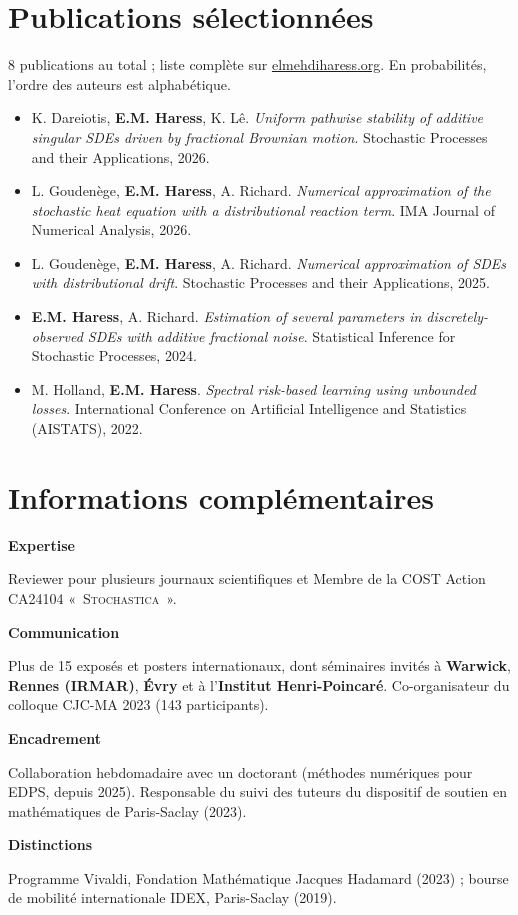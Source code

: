 \documentclass[10pt,a4paper]{article}
\newlength{\datecol}\setlength{\datecol}{0.165\textwidth}
\newlength{\gutter}\setlength{\gutter}{1em}
\newlength{\bodycol}
\newcommand{\skillrow}[2]{%
  \par\noindent
  \begin{minipage}[t]{\datecol}
    \vspace{0pt}\raggedright{\headingfont\bfseries\footnotesize #1}
  \end{minipage}%
  \hspace{\gutter}%
  \begin{minipage}[t]{\bodycol}
    \vspace{0pt}\raggedright\small #2
  \end{minipage}%
  \par\vspace{0.7ex}
}
\begin{document}
\section{Publications sélectionnées}
{\footnotesize\color{muted}8 publications au total ; liste complète sur \href{https://elmehdiharess.org}{elmehdiharess.org}.
En probabilités, l'ordre des auteurs est alphabétique.\par}
\vspace{0.6ex}
\begin{itemize}[leftmargin=1.3em, itemsep=0.35ex, topsep=0pt, label={\textcolor{accent}{\scriptsize$\blacktriangleright$}}]
  \footnotesize
  \item K. Dareiotis, \textbf{E.M. Haress}, K. Lê. \emph{Uniform pathwise stability of additive singular SDEs
  driven by fractional Brownian motion}. Stochastic Processes and their Applications, 2026.
  \item L. Goudenège, \textbf{E.M. Haress}, A. Richard. \emph{Numerical approximation of the stochastic heat
  equation with a distributional reaction term}. IMA Journal of Numerical Analysis, 2026.
  \item L. Goudenège, \textbf{E.M. Haress}, A. Richard. \emph{Numerical approximation of SDEs with
  distributional drift}. Stochastic Processes and their Applications, 2025.
  \item \textbf{E.M. Haress}, A. Richard. \emph{Estimation of several parameters in discretely-observed SDEs
  with additive fractional noise}. Statistical Inference for Stochastic Processes, 2024.
  \item M. Holland, \textbf{E.M. Haress}. \emph{Spectral risk-based learning using unbounded losses}.
  International Conference on Artificial Intelligence and Statistics (AISTATS), 2022.
\end{itemize}

\section{Informations complémentaires}
\skillrow{Expertise}{Reviewer pour plusieurs journaux scientifiques et Membre de la COST Action CA24104
«~\textsc{Stochastica}~».}
\skillrow{Communication}{Plus de 15 exposés et posters internationaux, dont séminaires invités à
\textbf{Warwick}, \textbf{Rennes (IRMAR)}, \textbf{Évry} et à l'\textbf{Institut Henri-Poincaré}.
Co-organisateur du colloque CJC-MA 2023 (143 participants).}
\skillrow{Encadrement}{Collaboration hebdomadaire avec un doctorant (méthodes numériques pour EDPS, depuis 2025). Responsable du suivi des tuteurs du dispositif de soutien en mathématiques de
Paris-Saclay (2023).}
\skillrow{Distinctions}{Programme Vivaldi, Fondation Mathématique Jacques Hadamard (2023) ; bourse de
mobilité internationale IDEX, Paris-Saclay (2019).}
\end{document}

